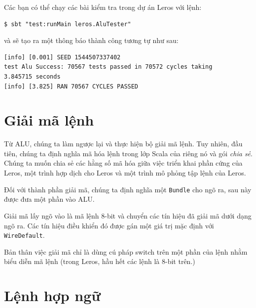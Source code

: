 \documentclass[%
    10pt,
    headinclude, footexclude,
    openright, %
    notitlepage,
    cleardoubleempty,
    headsepline,
    pointlessnumbers,
    bibtotoc, idxtotoc,
    ]{scrbook}
\newcommand{\code}[1]{{\small{\texttt{#1}}}}
\newcommand{\todo}[1]{{\emph{TODO: #1}}}
\renewcommand{\todo}[1]{}
\begin{document}

\noindent Các bạn có thể chạy các bài kiểm tra trong dự án Leros với lệnh:

\begin{verbatim}
$ sbt "test:runMain leros.AluTester"
\end{verbatim}

và sẽ tạo ra một thông báo thành công tương tự như sau:

\begin{verbatim}
[info] [0.001] SEED 1544507337402
test Alu Success: 70567 tests passed in 70572 cycles taking
3.845715 seconds
[info] [3.825] RAN 70567 CYCLES PASSED
\end{verbatim}

\section{Giải mã lệnh}


Từ ALU, chúng ta làm ngược lại và thực hiện bộ giải mã lệnh. Tuy nhiên, đầu tiên, chúng ta định nghĩa mã hóa lệnh trong lớp Scala của riêng nó và gói \emph{chia sẻ}. Chúng ta muốn chia sẻ các hằng số mã hóa giữa việc triển khai phần cứng của Leros, một trình hợp dịch cho Leros và một trình mô phỏng tập lệnh của Leros. 


\todo{Update code when Leros is more complete, as stuff is missing.}

\noindent Đối với thành phần giải mã, chúng ta định nghĩa một \code{Bundle} cho ngõ ra, sau này được đưa một phần vào ALU. 


\noindent Giải mã lấy ngõ vào là mã lệnh 8-bit và chuyển các tín hiệu đã giải mã dưới dạng ngõ ra. Các tín hiệu điều khiển đó được gán một giá trị mặc định với \code{WireDefault}. 


\noindent Bản thân việc giải mã chỉ là dùng cú pháp switch trên một phần của lệnh nhằm biểu diễn mã lệnh (trong Leros, hầu hết các lệnh là 8-bit trên.) 


\section{Lệnh hợp ngữ}
\end{document}
